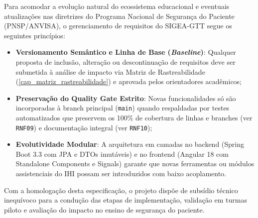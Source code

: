 Para acomodar a evolução natural do ecossistema educacional e eventuais atualizações nas diretrizes do Programa Nacional de Segurança do Paciente (PNSP/ANVISA), o gerenciamento de requisitos do SIGEA-GTT segue os seguintes princípios:
\begin{itemize}
    \item \textbf{Versionamento Semântico e Linha de Base (\textit{Baseline})}: Qualquer proposta de inclusão, alteração ou descontinuação de requisitos deve ser submetida à análise de impacto via Matriz de Rastreabilidade (\autoref{cap_matriz_rastreabilidade}) e aprovada pelos orientadores acadêmicos;
    \item \textbf{Preservação do Quality Gate Estrito}: Novas funcionalidades só são incorporadas à branch principal (\texttt{main}) quando respaldadas por testes automatizados que preservem os 100\% de cobertura de linhas e branches (ver \texttt{RNF09}) e documentação integral (ver \texttt{RNF10});
    \item \textbf{Evolutividade Modular}: A arquitetura em camadas no backend (Spring Boot 3.3 com JPA e DTOs imutáveis) e no frontend (Angular 18 com Standalone Components e Signals) garante que novas ferramentas ou módulos assistenciais do IHI possam ser introduzidos com baixo acoplamento.
\end{itemize}

Com a homologação desta especificação, o projeto dispõe de subsídio técnico inequívoco para a condução das etapas de implementação, validação em turmas piloto e avaliação do impacto no ensino de segurança do paciente.
